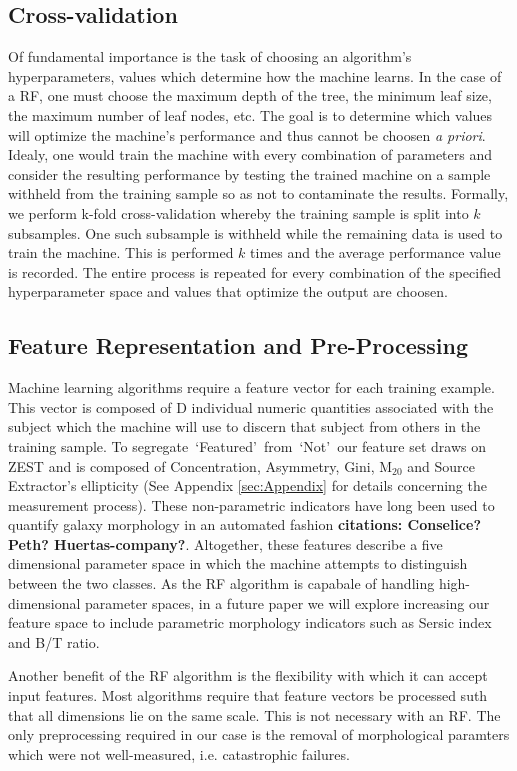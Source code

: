 \documentclass[twocolumn]{aastex6}
\newcommand{\feat}{`Featured'}
\newcommand{\notfeat}{`Not'}
\begin{document}
\subsection{Cross-validation}
Of fundamental importance is the task of choosing an algorithm's hyperparameters, 
values which determine how the machine learns.  In the case of a RF, one must 
choose the maximum depth of the tree, the minimum leaf size, the maximum
number of leaf nodes, etc. The goal is to determine which values will optimize 
the machine's performance and thus cannot be choosen \textit{a priori}. 
Idealy, one would train the machine with every combination of parameters and 
consider the resulting performance by testing the trained machine on a sample
withheld from the training sample so as not to contaminate the results. 
Formally, we perform k-fold cross-validation whereby the training sample is split
into $k$ subsamples. One such subsample is withheld while the remaining data is
used to train the machine. This is performed $k$ times and the average performance
value is recorded. The entire process is repeated for every combination of the 
specified hyperparameter space and values that optimize the output are choosen. 

 
\subsection{Feature Representation and Pre-Processing}
Machine learning algorithms require a feature vector for each training example. 
This vector is composed of D individual numeric quantities associated with the 
subject which the machine will use to discern that subject from others in the 
training sample. To segregate~\feat~from~\notfeat~our feature set draws 
on ZEST \citep{Scarlata2007} and  is composed of Concentration, Asymmetry, Gini, 
M$_{20}$ and Source Extractor's ellipticity 
(See Appendix \ref{sec:Appendix} for details concerning the measurement process). 
These non-parametric indicators have long been used to 
quantify galaxy morphology in an automated fashion \textbf{citations: Conselice? Peth? Huertas-company?}. 
Altogether, these features describe a five dimensional parameter space in 
which the machine attempts to distinguish between the two classes. 
As the RF algorithm is capabale of handling high-dimensional parameter spaces, in
a future paper we will explore increasing our feature space to include parametric
morphology indicators such as Sersic index and B/T ratio. 

Another benefit of the RF algorithm is the flexibility with which it can accept input 
features. Most algorithms require that feature vectors be processed suth that all 
dimensions lie on the same scale. This is not necessary with an RF. The only
preprocessing required in our case is the removal of morphological paramters which
were not well-measured, i.e. catastrophic failures. 
\end{document}
